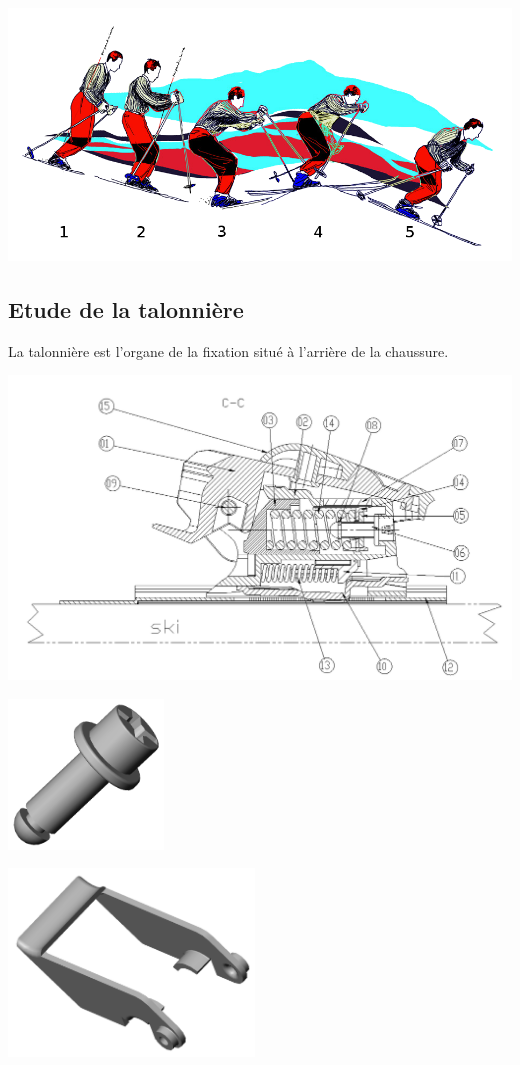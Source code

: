 \begin{center}
\includegraphics[width=0.8\linewidth]{img/passage_bosse.png}
\end{center}

\subsection{Etude de la talonnière}

La talonnière est l'organe de la fixation situé à l'arrière de la chaussure.

\begin{center}
\includegraphics[width=0.7\linewidth]{img/talonniere.png}
\end{center}

 \begin{minipage}{0.3\linewidth}
   \centering\includegraphics[height=4cm]{img/vis.png}
 \end{minipage}
 \hfill
  \begin{minipage}{0.3\linewidth}
  \centering\includegraphics[height=5cm]{img/levier_reglage.png}
  \end{minipage}

